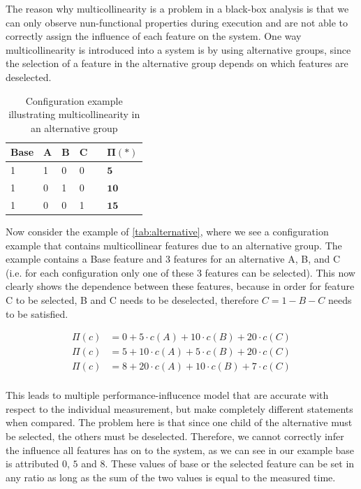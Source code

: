 The reason why multicollinearity is a problem in a black-box analysis is
that we can only observe nun-functional properties during execution and are not able to correctly assign the influence of each feature
on the system. One way multicollinearity is introduced into a system is by using alternative groups, since the selection of a feature in the
alternative group depends on which features are deselected. \cite{Multicollinearity}

\begin{table}[h]
    \centering
    \begin{tabular}{llllll}
    \hline
    Base & A & B & C &  & $\bm{\Pi(*)}$ \\ \hline
    1 & 1 & 0 & 0 &  & $\mathbf{5}$  \\
    1 & 0 & 1 & 0 &  & $\mathbf{10}$  \\  
    1 & 0 & 0 & 1 &  & $\mathbf{15}$  \\\hline
    \end{tabular}  
    \caption{Configuration example illustrating multicollinearity in an alternative group}\label{tab:alternative}
\end{table}

Now consider the example of \autoref{tab:alternative}, where we see a configuration example that contains multicollinear features due to an alternative group.
The example contains a Base feature and 3 features for an alternative A, B, and C (i.e. for each configuration only one of these 3 features can be selected).
This now clearly shows the dependence between these features, because in order for feature C to be selected, B and C needs to be deselected, therefore
$C = 1 - B - C$ needs to be satisfied. 

\begin{align*}
    \Pi(c) &= 0 + 5 \cdot c(A) + 10\cdot c(B) + 20\cdot c(C) \\
    \Pi(c) &= 5 + 10 \cdot c(A) + 5\cdot c(B) + 20\cdot c(C) \\
    \Pi(c) &= 8 + 20 \cdot c(A) + 10\cdot c(B) + 7\cdot c(C) \\
\end{align*}

This leads to multiple performance-influcence model that are accurate with respect to the individual measurement, 
but make completely different statements when compared.
The problem here is that since one child of the alternative must be selected, the others must be deselected. Therefore, we cannot correctly infer the influence
all features has on to the system, as we can see in our example base is attributed $0$, $5$ and $8$. 
These values of base or the selected feature can be set in any ratio as long as the sum of the two values is equal to the measured time.

